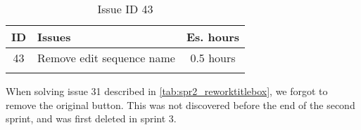 \begin{longtable} { | c | p{12cm} | c | } 
\hline
	ID 	&	Issues	&		 Es. hours \\\hline
	43	&	Remove edit sequence name 					&	0.5 hours \\\hline
\caption{Issue ID 43}
\label{tab:spr3_removeeditnamebutton}
\end{longtable}

When solving issue 31 described in \ref{tab:spr2_reworktitlebox}, we forgot to remove the original button. This was not discovered before the end of the second sprint, and was first deleted in sprint 3.